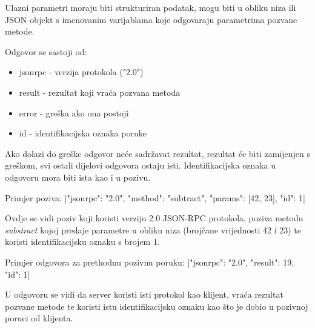 Ulazni parametri moraju biti strukturiran podatak, mogu biti u obliku niza ili
JSON objekt s imenovanim varijablama koje odgovaraju parametrima pozvane
metode.

Odgovor se sastoji od:
\begin{itemize}
    \item jsonrpc - verzija protokola ("2.0")
    \item result - rezultat koji vraća pozvana metoda
    \item error - greška ako ona postoji
    \item id - identifikacijska oznaka poruke
\end{itemize}

Ako dolazi do greške odgovor neće sadržavat rezultat, rezultat će biti
zamijenjen s greškom, svi ostali dijelovi odgovora ostaju isti.
Identifikacijska oznaka u odgovoru mora biti ista kao i u pozivu.

Primjer poziva:
|{"jsonrpc": "2.0", "method": "subtract", "params": [42, 23], "id": 1}|

Ovdje se vidi poziv koji koristi verziju 2.0 JSON-RPC protokola, poziva metodu
\emph{substract} kojoj predaje parametre u obliku niza (brojčane vrijednosti 42
i 23) te koristi identifikacijsku oznaku s brojem 1.

Primjer odgovora za prethodnu pozivnu poruku:
|{"jsonrpc": "2.0", "result": 19, "id": 1}|

U odgovoru se vidi da server koristi isti protokol kao klijent, vraća rezultat
pozvane metode te koristi istu identifikacijsku oznaku kao što je dobio u
pozivnoj poruci od klijenta.

